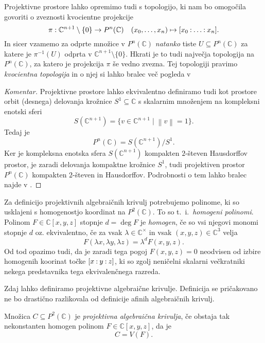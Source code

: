 \documentclass[mat1]{fmfdelo}
\newcommand{\C}{\mathbb C}
\newcommand{\CM}{\mathbb C ^\times}
\newcommand{\PC}{P^2(\mathbb C)}
\newcommand{\inv}{^{-1}}
\newcommand{\pcoor}[1]{%
  \begingroup\lccode`~=`: \lowercase{\endgroup
  \edef~}{\mathbin{\mathchar\the\mathcode`:}\nobreak}%
  [%
  \begingroup
  \mathcode`:=\string"8000
  #1%
  \endgroup
  ]%
}
\theoremstyle{definition}
\newenvironment{komentar}[1][Komentar]{\begin{proof}[#1]\let\qed\relax}{\end{proof}}
\begin{document}
\begin{opomba} 
    \label{topologija na projektivnih prostorih}   
    Projektivne prostore lahko opremimo tudi s topologijo, ki nam bo omogočila govoriti o zveznosti kvocientne projekcije
    \[
        \pi : \C^{n+1}\setminus\{0\} \to P^n(\C) \quad (x_0, \ldots, x_n) \mapsto \pcoor{x_0 : \ldots : x_n}. 
    \]
    In sicer vzamemo za odprte množice v $P^n(\C)$ \emph{natanko} tiste $U \subseteq P^n(\C)$ za katere je $\pi\inv(U)$ odprta v $\C^{n+1}\setminus\{0\}$. Hkrati je to tudi največja topologija na $P^n(\C)$, za katero je projekcija $\pi$ še vedno zvezna.  
    Tej topologiji pravimo \emph{kvocientna topologija} in o njej si lahko bralec več pogleda v \cite[poglavje 3.2.]{MrcunTop}
\end{opomba}

\begin{komentar}
    Projektivne prostore lahko ekvivalentno definiramo tudi kot prostore orbit (desnega) delovanja krožnice $S^1 \subseteq \C$ s skalarnim množenjem na kompleksni enotski sferi 
    \[
        S(\C^{n+1}) = \{v \in \C^{n+1} \mid \left\lVert v\right\rVert = 1\}.
    \]
    Tedaj je
    \[
        P^n(\C) = S(\C^{n+1})/S^1.
    \]
    Ker je kompleksna enotska sfera $S(\C^{n+1})$ kompakten $2$-števen Hausdorffov prostor, je zaradi delovanja kompaktne krožnice $S^1$, tudi projektiven prostor $P^n(\C)$ kompakten $2$-števen in Hausdorffov. Podrobnosti o tem lahko bralec najde v 
    \cite[Zgled 3.43. (2)]{MrcunTop}.
\end{komentar}

Za definicijo projektivnih algebraičnih krivulj potrebujemo  polinome, ki so usklajeni s homogenostjo koordinat na $\PC$. To so t.~i.\ \emph{homogeni polinomi}. Polinom $F \in \C[x,y,z]$ stopnje $d = \deg F$ je \emph{homogen}, če so vsi njegovi monomi stopnje $d$ oz. ekvivalentno, če za vsak $\lambda \in \CM$ in vsak $(x,y,z) \in \C^3$ velja
\[
    F(\lambda x, \lambda y, \lambda z) = \lambda^d F(x,y,z). 
\]
Od tod opazimo tudi, da je zaradi tega pogoj $F(x,y,z) = 0$ neodvisen od izbire homogenih koorinat točke $\pcoor{x : y : z}$, ki so zgolj neničelni skalarni večkratniki nekega predstavnika tega ekvivalenčnega razreda.  

Zdaj lahko definiramo projektivne algebraične krivulje. Definicija se pričakovano ne bo drastično razlikovala od definicije afinih algebraičnih krivulj.

\begin{definicija}
    Množica $C \subseteq \PC$ je \emph{projektivna algebraična krivulja}, če obstaja tak nekonstanten homogen polinom $F \in \C[x,y,z]$, da je
    \[
        C = V(F). 
    \]
\end{definicija}
\end{document}
